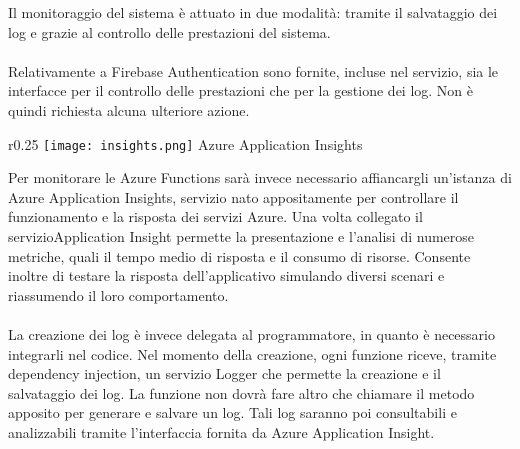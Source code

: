 Il monitoraggio del sistema è attuato in due modalità:
tramite il salvataggio dei log e grazie al controllo delle prestazioni del sistema.\\
\\
Relativamente a Firebase Authentication sono fornite, incluse nel servizio,
sia le interfacce per il controllo delle prestazioni che per la gestione dei log.
Non è quindi richiesta alcuna ulteriore azione.\\
\begin{wrapfigure}{r}{0.25\textwidth}
    \centering
    \texttt{[image: insights.png]}
    Azure Application Insights
\end{wrapfigure}
Per monitorare le Azure Functions sarà invece necessario
affiancargli un'istanza di Azure Application Insights,
servizio nato appositamente per controllare il funzionamento e la risposta dei servizi Azure.
Una volta collegato il servizioApplication Insight
permette la presentazione e l'analisi di numerose metriche,
quali il tempo medio di risposta e il consumo di risorse.
Consente inoltre di testare la risposta dell'applicativo
simulando diversi scenari e riassumendo il loro comportamento.\\
\\
La creazione dei log è invece delegata al programmatore,
in quanto è necessario integrarli nel codice.
Nel momento della creazione, ogni funzione riceve, tramite dependency injection,
un servizio Logger che permette la creazione e il salvataggio dei log.
La funzione non dovrà fare altro che chiamare
il metodo apposito per generare e salvare un log.
Tali log saranno poi consultabili e analizzabili tramite l'interfaccia fornita da Azure Application Insight.
\clearpage